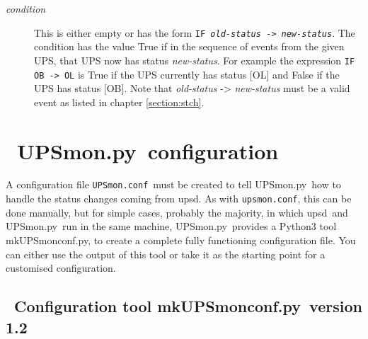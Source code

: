 \documentclass[12pt]{article}
\newlength{\headersep}\setlength{\headersep}{3mm}
\newcommand{\Hsep}{\hspace{\headersep}}
\newcommand{\newcolumn}{\vfill\eject}
\newcommand{\upsd}{\mbox{\textcolor{UPSDCOLOUR}{upsd}}}
\newcommand{\UPSmon}{\mbox{\textcolor{UPSMONCOLOUR}{UPSmon.py}}}
\newcommand{\mkUPSmonconf}{\mbox{\textcolor{UPSMONCOLOUR}{mkUPSmonconf.py}}}
\newcommand{\status}[1]{\textcolor{UPSDCOLOUR}{[{#1}]}}
\newcommand{\upsmonconf}{\textcolor{MONCOLOUR}{\texttt{upsmon.conf}}}
\newcommand{\UPSmonconf}{\textcolor{UPSMONCOLOUR}{\texttt{UPSmon.conf}}}
\begin{document}
\begin{description}
\begin{description}
\end{description}

\item[\textit{condition}] \hspace{7mm} This is either empty or has the form
  \texttt{IF \textit{old-status} -> \textit{new-status}}. The condition has
  the value True if in the sequence of events from the given UPS, that UPS now
  has status \textit{new-status}.  For example the expression \texttt{IF OB
    -> OL} is True if the UPS currently has status \status{OL} and False if
  the UPS has status \status{OB}.  Note that \textit{old-status} ->
  \textit{new-status} must be a valid event as listed in chapter
  \ref{section:stch}.

\end{description}

\vspace*{\fill}

\begin{center}
\end{center}

\vspace*{\fill}

\newcolumn
\section{\Hsep\ \UPSmon\ configuration}\label{section:conf}

A configuration file \UPSmonconf\ must be created to tell \UPSmon\ how to
handle the status changes coming from \upsd.  As with \upsmonconf, this can be
done manually, but for simple cases, probably the majority, in which
\upsd\ and \UPSmon\ run in the same machine, \UPSmon\ provides a Python3 tool
\mkUPSmonconf, to create a complete fully functioning configuration file.  You
can either use the output of this tool or take it as the starting point for a
customised configuration.

\subsection{\Hsep\ Configuration tool \mkUPSmonconf\ version 1.2}\label{section:mkUPSmonconf}
\end{document}
